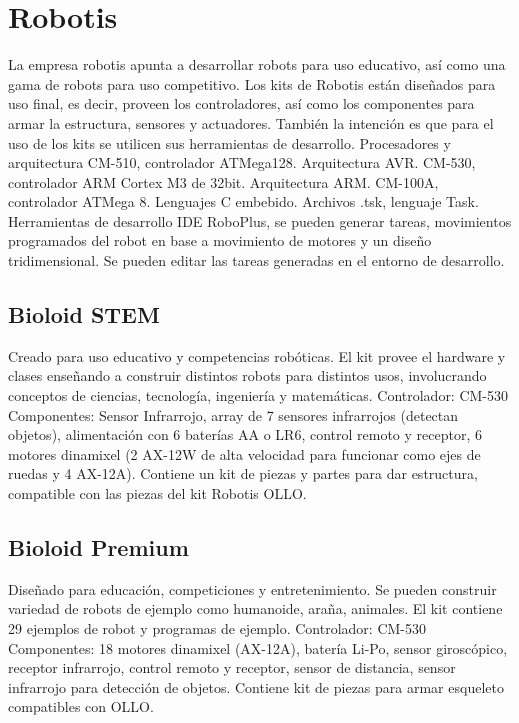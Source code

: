 
\section {Robotis}


La empresa robotis apunta a desarrollar robots para uso educativo, así como una gama de robots para uso competitivo. Los kits de Robotis están diseñados para uso final, es decir, proveen los controladores, así como los componentes para armar la estructura, sensores y actuadores. También la intención es que para el uso de los kits se utilicen sus herramientas de desarrollo.
Procesadores y arquitectura
  CM-510, controlador ATMega128. Arquitectura AVR.
  CM-530, controlador ARM Cortex M3 de 32bit. Arquitectura ARM.
  CM-100A, controlador ATMega 8.
Lenguajes
  C embebido. Archivos .tsk, lenguaje Task.
Herramientas de desarrollo
  IDE RoboPlus, se pueden generar tareas, movimientos programados del robot en base a movimiento de motores y un diseño tridimensional. Se pueden editar las tareas generadas en el entorno de desarrollo.


\subsection{Bioloid STEM}
Creado para uso educativo y competencias robóticas. El kit provee el hardware y clases enseñando a construir distintos robots para distintos usos, involucrando conceptos de ciencias, tecnología, ingeniería y matemáticas.
Controlador:
CM-530
Componentes:
Sensor Infrarrojo, array de 7 sensores infrarrojos (detectan objetos), alimentación con 6 baterías AA o LR6, control remoto y receptor, 6 motores dinamixel (2 AX-12W de alta velocidad para funcionar como ejes de ruedas y 4 AX-12A). Contiene un kit de piezas y partes para dar estructura, compatible con las piezas del kit Robotis OLLO.

\subsection{Bioloid Premium}
Diseñado para educación, competiciones y entretenimiento. Se pueden construir variedad de robots de ejemplo como humanoide, araña, animales. El kit contiene 29 ejemplos de robot y programas de ejemplo.
Controlador:
CM-530
Componentes:
18 motores dinamixel (AX-12A), batería Li-Po, sensor giroscópico, receptor infrarrojo, control remoto y receptor, sensor de distancia, sensor infrarrojo para detección de objetos. Contiene kit de piezas para armar esqueleto compatibles con OLLO.

